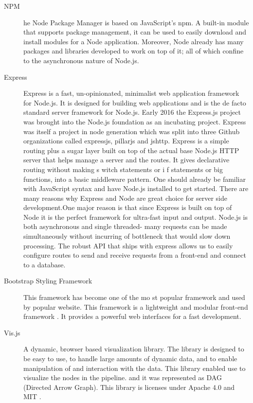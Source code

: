 \begin{description}
\begin{itemize}
    \end{itemize}
    \item[NPM] he Node Package Manager is based on JavaScript's npm. A built-in module that supports package management, it can be used to easily download and install modules for a Node application. Moreover, Node already has many packages and libraries developed to work on top of it; all of which confine to the asynchronous nature of Node.js.
    \item[Express] Express is a fast, un-opinionated, minimalist web application framework for Node.js. It is designed for building web applications and is the de facto standard server framework for Node.js. Early 2016 the Express.js project was brought into the Node.js foundation as an incubating project. Express was itself a project in node generation which was split into three Github organizations called expressjs, pillarjs and jshttp. Express is a simple routing plus a sugar layer built on top of the actual base Node.js HTTP server that helps manage a server and the routes. It gives declarative routing without making s witch statements or i f statements or big functions, into a basic middleware pattern. \cite{express}
    \newline
    \newline
    One should already be familiar with JavaScript syntax and have Node.js installed to get started. There are many reasons why Express and Node are great choice for server side development.One major reason is that since Express is built on top of Node it is the perfect framework for ultra-fast input and output. Node.js is both asynchronous and single threaded- many requests can be made simultaneously without incurring of bottleneck that would slow down processing. The robust API that ships with express allows us to easily configure routes to send and receive
    requests from a front-end and connect to a database. \cite{express}
    \item[Bootstrap Styling Framework] This  framework  has  become  one  of  the  mo
    st  popular  framework  and  used  by  popular website. This framework is  a  lightweight  and  modular  front-end  framework  \cite{bootstrap}.   It  provides  a powerful  web  interfaces for a fast development.
    \item[Vis.js] A dynamic, browser based visualization library. The library is designed to be easy to use, to handle large amounts of dynamic data, and to enable manipulation of and interaction with the data. This library enabled use to visualize the nodes in the pipeline. and it was represented as DAG (Directed Arrow Graph). This library is licenses under Apache 4.0 and MIT \cite{visjs}.
\end{description}

